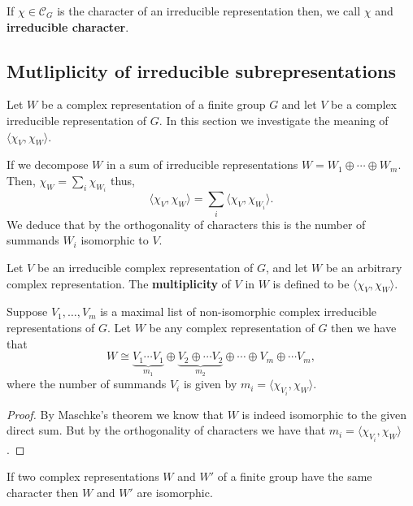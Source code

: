 \documentclass[12pt, a4paper]{article}
\begin{document}
\begin{definition}
    If \(\chi \in \mathcal{C}_G\) is the character of an irreducible representation then, we call \(\chi\) and \textbf{irreducible character}.
\end{definition}

\subsection{Mutliplicity of irreducible subrepresentations}

Let \(W\) be a complex representation of a finite group \(G\) and let \(V\) be a complex irreducible representation of \(G\). In this section we investigate the meaning of \(\langle \chi_V,\chi_W \rangle\). 

If we decompose \(W\) in a sum of irreducible representations \(W = W_1 \oplus \cdots \oplus W_m\). Then, \(\chi_W=\sum_i \chi_{W_i} \) thus,
\[\langle \chi_V,\chi_W \rangle =\sum_i \langle \chi_V,\chi_{W_i}\rangle.\]
We deduce that by the orthogonality of characters this is the number of summands \(W_i\) isomorphic to \(V\).

\begin{definition}
    Let \(V\) be an irreducible complex representation of \(G\), and let \(W\) be an arbitrary complex representation. The \textbf{multiplicity} of \(V\) in \(W\) is defined to be \(\langle \chi_V,\chi_W \rangle\).
\end{definition}

\begin{mdlemma}
    Suppose \(V_1,\ldots,V_m\) is a maximal list of non-isomorphic complex irreducible representations of \(G\). Let \(W\) be any complex representation of \(G\) then we have that 
    \[W \cong \underbrace{V_1 \cdots V_1}_{m_1} \oplus \underbrace{V_2 \oplus \cdots V_2}_{m_2} \oplus \cdots \oplus V_m \oplus \cdots V_m,\]
    where the number of summands \(V_i\) is given by \(m_i = \langle \chi_{V_i},\chi_{W}\rangle\).
\end{mdlemma}

\begin{proof}
    By Maschke's theorem we know that \(W\) is indeed isomorphic to the given direct sum. But by the orthogonality of characters we have that \(m_i = \langle \chi_{V_i}, \chi_W \rangle\).
\end{proof}

\begin{mdcor}
    If two complex representations \(W\) and \(W'\) of a finite group have the same character then \(W\) and \(W'\) are isomorphic.
\end{mdcor}
\end{document}

